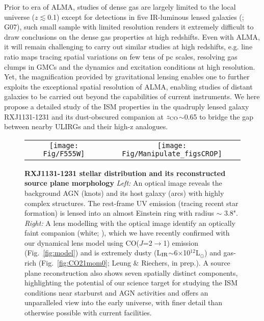 \documentclass[12pt,a4paper]{article}  %
\newcommand{\Lsun}{\mbox{L$_{\odot}$}\xspace}
\newcommand{\LIR}{\mbox{L$_{\rm IR}$}\xspace}
\newcommand{\rarr}{$\rightarrow$}
\newcommand{\bco}{\mbox{CO($J$=2\rarr1)}\xspace}
\newcommand{\Fig}[1]{Fig.~\ref{fig:#1}}
\begin{document}
Prior to era of ALMA, studies of dense gas are largely limited to the local universe ($z\lesssim$0.1) 
except for detections in five IR-luminous lensed galaxies (\citealt{Riechers06a, Riechers07a, Wagg05a}; G07), 
such small sample with limited resolution renders it extremely difficult 
to draw conclusions on the dense gas properties at high redshifts. 
Even with ALMA, it will remain challenging to carry out
similar studies at high redshifts, e.g. line ratio maps tracing spatial variations 
on few tens of pc scales, resolving gas clumps in GMCs and the dynamics and excitation
conditions at high resolution. 
Yet, the magnification provided by gravitational lensing enables one
to further exploits the exceptional spatial resolution of ALMA, enabling studies
of distant galaxies to be carried out beyond the capabilities of current instruments. 
We here propose a detailed study of the ISM properties in the
quadruply lensed galaxy RXJ1131-1231 and its dust-obscured companion at $z_{\rm CO}$$\sim$0.65
to bridge the gap between nearby ULIRGs and their high-z analogues.


\begin{figure}[!tbhp]
\centering
\begin{tabular}{@{}cc@{}}
\texttt{[image: Fig/F555W]} &
\texttt{[image: Fig/Manipulate\_figsCROP]}
\end{tabular}
\vspace{-1em}
\caption{ \fontsize{10pt}{12pt}\selectfont 
{
\textbf{RXJ1131-1231 stellar distribution and its reconstructed source plane
morphology}
{\em Left:} An optical image 
reveals the background AGN (knots)
and its host galaxy (arcs) with highly complex structures. The rest-frame UV emission (tracing
recent star formation) 
is lensed into an almost Einstein ring with radius $\sim$ 3.8". 
{\em Right:} A lens modelling with the optical image identify an optically faint
companion (white; \citealt{Claeskens06a}), 
which we have recently confirmed with our dynamical lens model using \bco emission
(\Fig{model}) and is extremely dusty 
(\LIR$\sim$6$\times$10$^{12}$\Lsun) and gas-rich (\Fig{CO21mom0}; Leung \& Riechers, in prep.). 
A source plane reconstruction also shows seven spatially distinct components, 
highlighting the potential of our science target 
for studying the ISM conditions near starburst and AGN activities and offers an unparalleled
view into the early universe, with finer
detail than otherwise possible with current facilities. 
}
\label{fig:HST}}
\end{figure}
\end{document}
